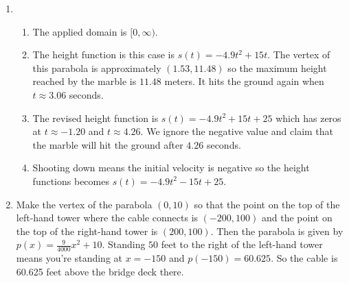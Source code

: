 \documentclass{ximera}
\begin{document}
\begin{enumerate}
\setcounter{enumi}{\value{HW}}


\item \begin{enumerate}

\item The applied domain is $[0, \infty)$.

\addtocounter{enumii}{2}

\item The height function is this case is $s(t) = -4.9t^{2} + 15t$.  The vertex of this parabola is approximately $(1.53, 11.48)$ so the maximum height reached by the marble is $11.48$ meters.  It hits the ground again when $t \approx 3.06$ seconds.

\item The revised height function is $s(t) = -4.9t^{2} + 15t + 25$ which has zeros at $t \approx -1.20$ and $t \approx 4.26$.  We ignore the negative value and claim that the marble will hit the ground after $4.26$ seconds.

\item Shooting down means the initial velocity is negative so the height functions becomes $s(t) = -4.9t^{2} - 15t + 25$.

\end{enumerate}

\item Make the vertex of the parabola $(0, 10)$ so that the point on the top of the left-hand tower where the cable connects is $(-200, 100)$ and the point on the top of the right-hand tower is $(200, 100)$.  Then the parabola is given by $p(x) = \frac{9}{4000}x^{2} + 10$.  Standing $50$ feet to the right of the left-hand tower means you're standing at $x= -150$ and $p(-150) = 60.625$.  So the cable is 60.625 feet above the bridge deck there.


\setcounter{HW}{\value{enumi}}
\end{enumerate}
\end{document}

